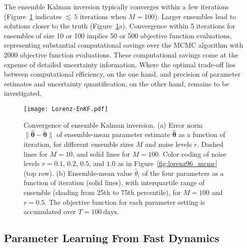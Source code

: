 \documentclass[draft]{agujournal}
\renewcommand{\vec}[1]{\boldsymbol{{#1}}}
\begin{document}
The ensemble Kalman inversion typically converges within a few iterations (Figure~\ref{fig:EnKFerr_lorenz96ms} indicates ${\lesssim}\,5$ iterations when $M=100$). Larger ensembles lead to solutions closer to the truth (Figure~\ref{fig:EnKFerr_lorenz96ms}a). Convergence within 5 iterations for ensembles of size 10 or 100 implies 50 or 500 objective function evaluations, representing substantial computational savings over the MCMC algorithm with 2000 objective function evaluations. These computational savings come at the expense of detailed uncertainty information. Where the optimal trade-off lies between computational efficiency, on the one hand, and precision of parameter estimates and uncertainty quantification, on the other hand, remains to be investigated. 
\begin{figure}[htb] %
   \centering
   \texttt{[image: Lorenz-EnKF.pdf]}
   \caption{Convergence of ensemble Kalman inversion. (a) Error norm $\|\vec{\hat\theta} - \vec{\tilde\theta}\|$ of ensemble-mean parameter estimate $\vec{\hat\theta}$ as a function of iteration, for different ensemble sizes $M$ and noise levels $r$. Dashed lines for $M=10$, and solid lines for $M=100$. Color coding of noise levels $r=0.1$, $0.2$, $0.5$, and $1.0$ as in Figure~\ref{fig:lorenz96_mcmc} (top row). (b) Ensemble-mean value $\hat\theta_i$ of the four parameters as a function of iteration (solid lines), with interquartile range of ensemble (shading from 25th to 75th percentile), for $M=100$ and $r=0.5$. The objective function for each parameter setting is accumulated over $T=100~\mathrm{days}$.}
   \label{fig:EnKFerr_lorenz96ms}
\end{figure}

\subsection{Parameter Learning From Fast Dynamics}
\end{document}
